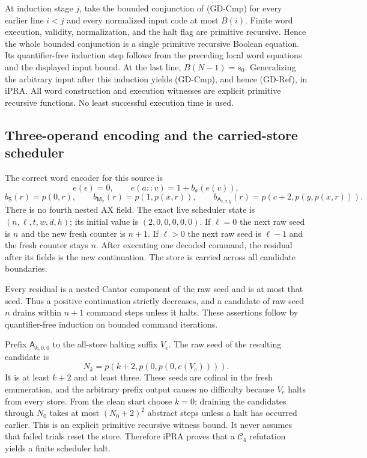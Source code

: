 At induction stage $j$, take the bounded conjunction of (GD-Cmp) for
every earlier line $i<j$ and every normalized input code at most $B(i)$.
Finite word execution, validity, normalization, and the halt flag are
primitive recursive.  Hence the whole bounded conjunction is a single
primitive recursive Boolean equation.  Its quantifier-free induction
step follows from the preceding local word equations and the displayed
input bound.  At the last line, $B(N-1)=s_0$.  Generalizing the arbitrary
input after this induction yields (GD-Cmp), and hence (GD-Ref), in iPRA.
All word construction and execution witnesses are explicit primitive
recursive functions.  No least successful execution time is used.

\subsection{Three-operand encoding and the carried-store scheduler}

The correct word encoder for this source is
\[
 e(\epsilon)=0,\qquad e(a::v)=1+b_a(e(v)),
\]
\[
 b_{\mathsf S}(r)=p(0,r),\qquad
 b_{\mathsf M_x}(r)=p(1,p(x,r)),\qquad
 b_{\mathsf A_{c,x,y}}(r)=p(c+2,p(y,p(x,r))).              \tag{GD-Enc}\label{eq:gd-enc}
\]
There is no fourth nested AX field.  The exact live scheduler state is
$(n,\ell,t,w,d,h)$; its initial value is $(2,0,0,0,0,0)$.  If $\ell=0$
the next raw seed is $n$ and the new fresh counter is $n+1$.  If $\ell>0$
the next raw seed is $\ell-1$ and the fresh counter stays $n$.  After
executing one decoded command, the residual after its fields is the new
continuation.  The store is carried across all candidate boundaries.

Every residual is a nested Cantor component of the raw seed and is at
most that seed.  Thus a positive continuation strictly decreases, and a
candidate of raw seed $n$ drains within $n+1$ command steps unless it
halts.  These assertions follow by quantifier-free induction on bounded
command iterations.

Prefix $\mathsf A_{k,0,0}$ to the all-store halting suffix $V_e$.
The raw seed of the resulting candidate is
\[
                  N_k=p(k+2,p(0,p(0,e(V_e)))).            \tag{GD-Seed}\label{eq:gd-seed}
\]
It is at least $k+2$ and at least three.  These seeds are cofinal in the
fresh enumeration, and the arbitrary prefix output causes no difficulty
because $V_e$ halts from every store.  From the clean start choose $k=0$;
draining the candidates through $N_0$ takes at most $(N_0+2)^2$ abstract
steps unless a halt has occurred earlier.  This is an explicit primitive
recursive witness bound.  It never assumes that failed trials reset the
store.  Therefore iPRA proves that a $\mathcal C_4$ refutation yields a
finite scheduler halt.

